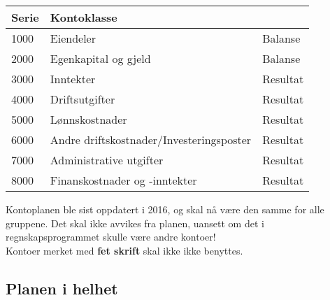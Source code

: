 \begin{table}[h]
	\begin{tabular}[c]{l l l}
		Serie & Kontoklasse \\ \hline
		1000 & Eiendeler & Balanse \\
		2000 & Egenkapital og gjeld & Balanse \\
		3000 & Inntekter & Resultat \\
		4000 & Driftsutgifter & Resultat \\
		5000 & Lønnskostnader & Resultat \\
		6000 & Andre driftskostnader/Investeringsposter & Resultat \\
		7000 & Administrative utgifter & Resultat \\
		8000 & Finanskostnader og -inntekter & Resultat \\
	\end{tabular}
\end{table}




Kontoplanen ble sist oppdatert i 2016, og skal nå være den samme for alle gruppene.
Det skal ikke avvikes fra planen, uansett om det i regnskapsprogrammet skulle være andre kontoer!
\\
Kontoer merket med {\bfseries fet skrift} skal ikke ikke benyttes.
\subsection*{Planen i helhet}


